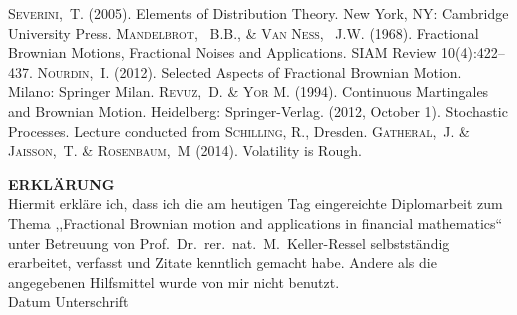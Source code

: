 \documentclass[a4paper, twoside, 11pt]{article}
\theoremstyle{definition}
\begin{document}
\begin{thebibliography}{99}
	\textsc{Severini,~T.} (2005). Elements of Distribution Theory. New York, NY: Cambridge University Press.
	 \textsc{Mandelbrot, ~B.B., \& Van Ness, ~J.W.} (1968). Fractional Brownian Motions, Fractional Noises and Applications. SIAM Review 10(4):422–437.
	 \textsc{Nourdin,~I.} (2012). Selected Aspects of Fractional Brownian Motion. Milano: Springer Milan.
	 \textsc{Revuz,~D. \& Yor M.} (1994). Continuous Martingales and Brownian Motion. Heidelberg: Springer-Verlag.
	 (2012, October 1). Stochastic Processes. Lecture conducted from \textsc{Schilling, R.}, Dresden.
	 \textsc{Gatheral,~J. \& Jaisson,~T. \& Rosenbaum,~M} (2014). Volatility is Rough.

\end{thebibliography}

\newpage
\thispagestyle{empty}
\Large
\textbf{ERKL\"ARUNG} \\[1em]
\large
Hiermit erkl\"are ich, dass ich die am heutigen Tag eingereichte Diplomarbeit zum Thema ,,Fractional Brownian motion and applications in financial mathematics`` unter Betreuung von Prof.\ Dr.\ rer.\ nat.\ M.\ Keller-Ressel selbstst\"andig erarbeitet, verfasst und Zitate kenntlich gemacht habe. Andere als die angegebenen Hilfsmittel wurde von mir nicht benutzt. \\[5em]
\vspace{2cm}
\large
Datum \hfill Unterschrift 
\end{document}
